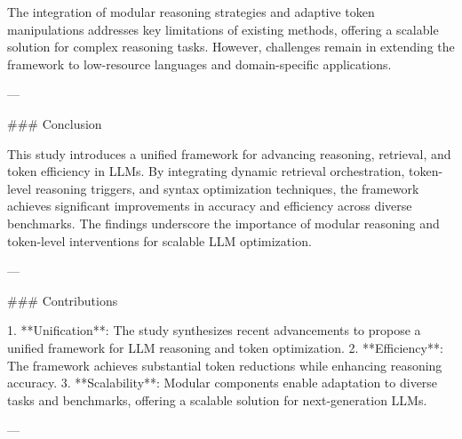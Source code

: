 The integration of modular reasoning strategies and adaptive token manipulations addresses key limitations of existing methods, offering a scalable solution for complex reasoning tasks. However, challenges remain in extending the framework to low-resource languages and domain-specific applications.

---

### Conclusion

This study introduces a unified framework for advancing reasoning, retrieval, and token efficiency in LLMs. By integrating dynamic retrieval orchestration, token-level reasoning triggers, and syntax optimization techniques, the framework achieves significant improvements in accuracy and efficiency across diverse benchmarks. The findings underscore the importance of modular reasoning and token-level interventions for scalable LLM optimization.

---

### Contributions

1. **Unification**: The study synthesizes recent advancements to propose a unified framework for LLM reasoning and token optimization.
2. **Efficiency**: The framework achieves substantial token reductions while enhancing reasoning accuracy.
3. **Scalability**: Modular components enable adaptation to diverse tasks and benchmarks, offering a scalable solution for next-generation LLMs.

---